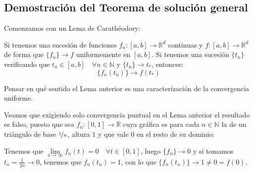 \subsection{Demostración del Teorema de solución general}
\noindent
Comenzamos con un Lema de Carathéodory:

\begin{lema}\label{lema:caratheodory}
    Si tenemos una sucesión de funciones $f_n:[a,b]\to \mathbb{R}^d$ continuas y $f:[a,b]\to \mathbb{R}^d$ de forma que $\{f_n\}\to f$ uniformemente en $[a,b]$. Si tenemos una sucesión $\{t_n\}$ verificando que $t_n \in [a,b]\quad \forall n\in \mathbb{N}$ y $\{t_n\}\to t_\ast$, entonces:
    \begin{equation*}
        \{f_n(t_n)\} \to f(t_\ast)
    \end{equation*}
\end{lema}

\begin{ejercicio}
    Pensar en qué sentido el Lema anterior es una caracterización de la convergencia uniforme. %
\end{ejercicio}

\begin{ejemplo}
    Veamos que exigiendo solo convergencia puntual en el Lema anterior el resultado es falso, puesto que sea $f_n:[0,1]\to \mathbb{R}$ cuya gráfica es para cada $n\in \mathbb{N}$ la de un triángulo de base $\nicefrac{1}{n}$, altura $1$ y que vale $0$ en el resto de su dominio:
    \begin{figure}[H]
        \centering
    \end{figure}
    \noindent
    Tenemos que $\lim\limits_{n\to\infty}f_n(t) = 0\quad \forall t\in [0,1]$, luego $\{f_n\}\to 0$ y si tomamos $t_n = \frac{1}{2n} \to 0$, tenemos que $f_n(t_n) = 1$, con lo que $\{f_n(t_n)\}\to 1\neq 0 = f(0)$.
\end{ejemplo}

